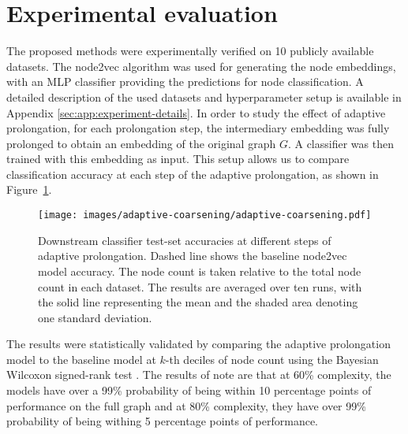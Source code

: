 \section{Experimental evaluation}\label{sec:experimental-evaluation}

The proposed methods were experimentally verified on 10 publicly available datasets. The node2vec algorithm was used for generating the node embeddings, with an MLP classifier providing the predictions for node classification. A detailed description of the used datasets and hyperparameter setup is available in Appendix \ref{sec:app:experiment-details}. In order to study the effect of adaptive prolongation, for each prolongation step, the intermediary embedding was fully prolonged to obtain an embedding of the original graph \( G \). A classifier was then trained with this embedding as input. This setup allows us to compare classification accuracy at each step of the adaptive prolongation, as shown in Figure~\ref{fig:adaptive-coarsening}.

\begin{figure}
  \centering
  \texttt{[image: images/adaptive-coarsening/adaptive-coarsening.pdf]}
  \caption{Downstream classifier test-set accuracies at different steps of adaptive prolongation. Dashed line shows the baseline node2vec model accuracy. The node count is taken relative to the total node count in each dataset. The results are averaged over ten runs, with the solid line representing the mean and the shaded area denoting one standard deviation.}
  \label{fig:adaptive-coarsening}
\end{figure}

The results were statistically validated by comparing the adaptive prolongation model to the baseline model at \( k \)-th deciles of node count using the Bayesian Wilcoxon signed-rank test \cite{benavoli_bayesian_2014}. The results of note are that at 60\% complexity, the models have over a 99\% probability of being within 10 percentage points of performance on the full graph and at 80\% complexity, they have over 99\% probability of being withing 5 percentage points of performance.

